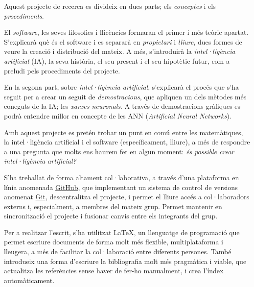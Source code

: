 Aquest projecte de recerca es divideix en dues parts; els \emph{conceptes}
i els \emph{procediments}.

El \emph{software}, les seves filosofies i llicències formaran el primer i més
teòric apartat. S'explicarà què és el software i es separarà en \emph{propietari}
i \emph{lliure}, dues formes de veure la creació i distribució del mateix. A més,
s'introduirà la \emph{intel·ligència artificial} (IA), la seva història, el seu present i el
seu hipotètic futur, com a preludi pels procediments del projecte.

En la segona part, sobre \emph{intel·ligència artificial}, s'explicarà el procés
que s'ha seguit per a crear un seguit de \emph{demostracions}, que apliquen un
dels mètodes més coneguts de la IA; les \emph{xarxes neuronals}. A través de demostracions
gràfiques es podrà entendre millor en concepte de les ANN (\emph{Artificial Neural Networks}).

Amb aquest projecte es pretén trobar un punt en comú entre les matemàtiques,
la intel·ligència artificial i el software (específicament, lliure), a més de
respondre a una pregunta que molts ens haurem fet en algun moment: \emph{és possible crear
intel·ligència artificial?}

S'ha treballat de forma altament col·laborativa, a través d'una plataforma
en línia anomenada \href{http://github.com}{GitHub}, que implementant un sistema
de control de versions anomenat \href{http://git-scm.com/}{Git}, descentralitza
el projecte, i permet el lliure accés a col·laboradors externs i, especialment, a membres
del mateix grup. Permet mantenir en sincronització el projecte i fusionar canvis entre els integrants del grup.

Per a realitzar l'escrit, s'ha utilitzat \LaTeX, un llenguatge de programació que permet escriure documents de forma molt més flexible, multiplataforma i lleugera, a més de facilitar la col·laboració entre diferents persones. També introdueix una forma d'escriure la bibliografia molt més pragmàtica i viable, que actualitza les referències sense haver de fer-ho manualment, i crea l'índex automàticament.
